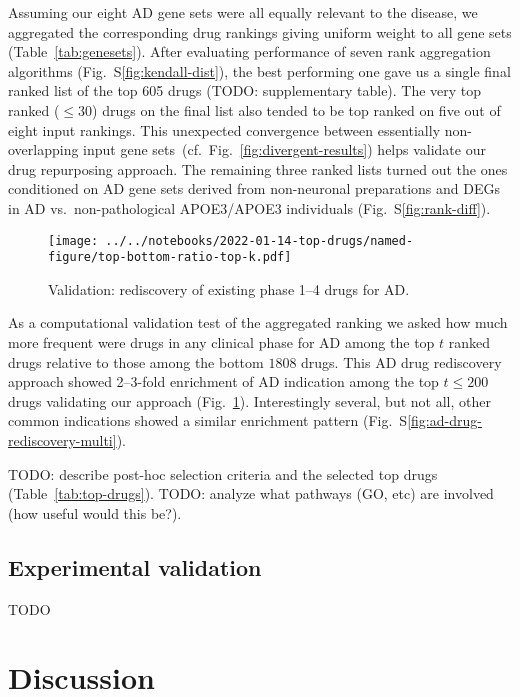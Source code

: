 \documentclass[letterpaper]{article}
\begin{document}
Assuming our eight AD gene sets were all equally relevant to the disease, we
aggregated the corresponding drug rankings giving uniform weight to all gene
sets (Table~\ref{tab:genesets}).  After evaluating performance of seven rank
aggregation algorithms (Fig.~S\ref{fig:kendall-dist}), the best performing one
gave us a single final ranked list of the top 605 drugs (TODO: supplementary table).
The very top ranked ($\le 30$) drugs on the final list also tended to be top ranked
on five out of eight input rankings.  This unexpected convergence between
essentially non-overlapping input gene
sets~(cf.~Fig.~\ref{fig:divergent-results}) helps validate our drug repurposing approach.
The remaining three ranked lists turned out the ones
conditioned on AD gene sets derived from non-neuronal preparations and DEGs in
AD vs.~non-pathological APOE3/APOE3 individuals (Fig.~S\ref{fig:rank-diff}).

\begin{figure}
\texttt{[image: ../../notebooks/2022-01-14-top-drugs/named-figure/top-bottom-ratio-top-k.pdf]}
\caption{
Validation: rediscovery of existing phase 1--4 drugs for AD.
}
\label{fig:ad-drug-rediscovery}
\end{figure}

As a computational validation test of the aggregated ranking we asked how much
more frequent were drugs in any clinical phase for AD among the top $t$ ranked
drugs relative to those among the bottom $1808$ drugs.  This AD drug
rediscovery approach showed 2--3-fold enrichment of AD indication among the
top $t \le 200$ drugs validating our approach
(Fig.~\ref{fig:ad-drug-rediscovery}).  Interestingly several, but not all,
other common indications showed a similar enrichment pattern
(Fig.~S\ref{fig:ad-drug-rediscovery-multi}).

TODO: describe post-hoc selection criteria and the selected top drugs
(Table~\ref{tab:top-drugs}).  TODO: analyze what pathways (GO, etc) are
involved (how useful would this be?).

\subsection{Experimental validation}

TODO

\section{Discussion}
\end{document}
